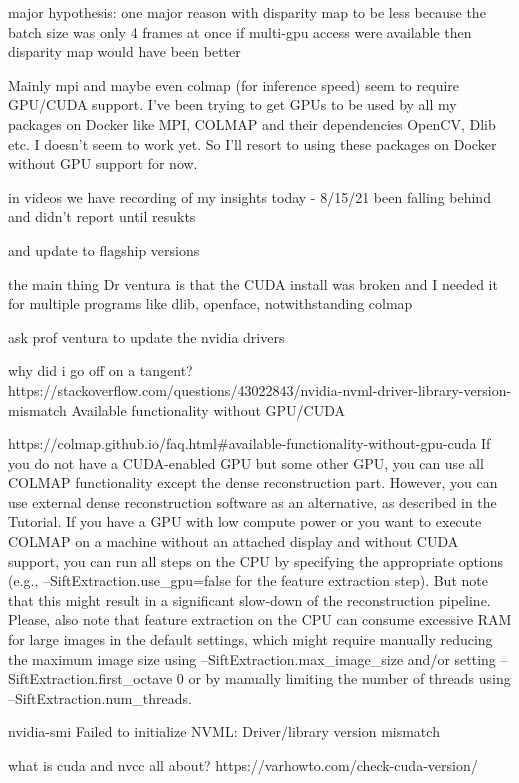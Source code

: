 major hypothesis: one major reason with disparity map to be less because the batch size was only 4 frames at once   
if multi-gpu access were available then disparity map would have been better 

Mainly mpi and maybe even colmap (for inference speed) seem to require GPU/CUDA support. I've been trying to get GPUs to be used by all my packages on Docker like MPI, COLMAP and their dependencies OpenCV, Dlib etc.
I doesn't seem to work yet. So I'll resort to using these packages on Docker without GPU support for now. 

in videos we have recording of my insights today - 8/15/21
been falling behind and didn't report until resukts 

and update to flagship versions

the main thing Dr ventura is that the CUDA install was broken and I needed it for multiple programs like dlib, openface, notwithstanding colmap 

ask prof ventura to update the nvidia drivers 

why did i go off on a tangent?
https://stackoverflow.com/questions/43022843/nvidia-nvml-driver-library-version-mismatch
Available functionality without GPU/CUDA

https://colmap.github.io/faq.html#available-functionality-without-gpu-cuda
If you do not have a CUDA-enabled GPU but some other GPU, you can use all COLMAP functionality except the dense reconstruction part. However, you can use external dense reconstruction software as an alternative, as described in the Tutorial. If you have a GPU with low compute power or you want to execute COLMAP on a machine without an attached display and without CUDA support, you can run all steps on the CPU by specifying the appropriate options (e.g., --SiftExtraction.use_gpu=false for the feature extraction step). But note that this might result in a significant slow-down of the reconstruction pipeline. Please, also note that feature extraction on the CPU can consume excessive RAM for large images in the default settings, which might require manually reducing the maximum image size using --SiftExtraction.max_image_size and/or setting --SiftExtraction.first_octave 0 or by manually limiting the number of threads using --SiftExtraction.num_threads.

nvidia-smi
Failed to initialize NVML: Driver/library version mismatch


what is cuda and nvcc all about?
https://varhowto.com/check-cuda-version/

